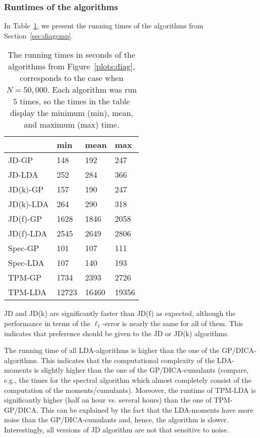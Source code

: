 \documentclass{article}
\begin{document}
\subsubsection{Runtimes of the algorithms}\label{sec:runtimes}
In Table~\ref{tab:runtimes}, we present the running times of the algorithms from Section~\ref{sec:diagcmp}. 
\begin{table}[t!]
\centering
\begin{tabular}{| l | l l l |} \hline
           & min   & mean  & max \\ \hline
 JD-GP     & 148   & 192   & 247 \\
 JD-LDA    & 252   & 284   & 366 \\ \hline
 JD(k)-GP  & 157   & 190   & 247 \\
 JD(k)-LDA & 264   & 290   & 318 \\ \hline
 JD(f)-GP  & 1628  & 1846  & 2058 \\
 JD(f)-LDA & 2545  & 2649  & 2806 \\ \hline
 Spec-GP   & 101   & 107   & 111 \\
 Spec-LDA  & 107   & 140   & 193 \\ \hline
 TPM-GP    & 1734  & 2393  & 2726 \\
 TPM-LDA   & 12723 & 16460  & 19356 \\ \hline
\end{tabular}
\caption{The running times in seconds of the algorithms from Figure~\ref{plots:diag}, corresponds to the case when $N=50,000$. Each algorithm was run $5$ times, so the times in the table display the minimum (min), mean, and maximum (max) time. }
\label{tab:runtimes}
\end{table} 
JD and JD(k) are significantly faster than JD(f) as expected, although the performance in terms of the $\ell_1$-error is nearly the same for all of them. This indicates that preference should be given to the JD or JD(k) algorithms.

The running time of all LDA-algorithms is higher than the one of the GP/DICA-algorithms. This indicates that the computational complexity of the LDA-moments is slightly higher than the one of the GP/DICA-cumulants (compare, e.g., the times for the spectral algorithm which almost completely consist of the computation of the moments/cumulants). Moreover, the runtime of TPM-LDA is significantly higher (half an hour vs. several hours) than the one of TPM-GP/DICA. This can be explained by the fact that the LDA-moments have more noise than the GP/DICA-cumulants and, hence, the algorithm is slower. Interestingly, all versions of JD algorithm are not that sensitive to noise. 
\end{document}
